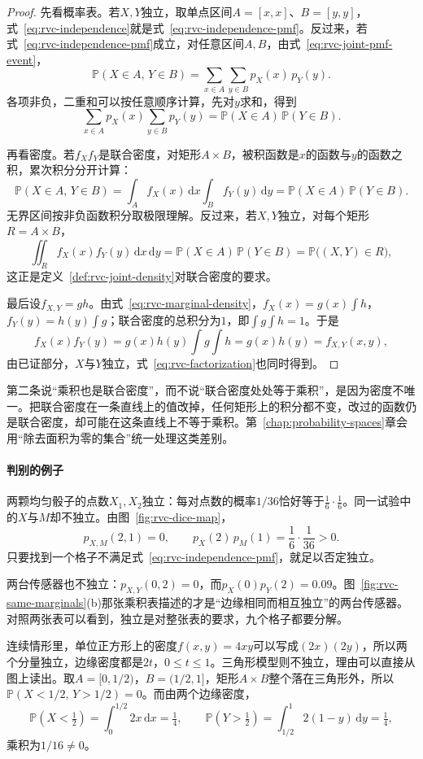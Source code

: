 \begin{proof}
先看概率表。若$X,Y$独立，取单点区间$A=[x,x]$、$B=[y,y]$，式~\eqref{eq:rvc-independence}就是式~\eqref{eq:rvc-independence-pmf}。反过来，若式~\eqref{eq:rvc-independence-pmf}成立，对任意区间$A,B$，由式~\eqref{eq:rvc-joint-pmf-event}，
\[
 \mathbb{P}(X\in A,\,Y\in B)=\sum_{x\in A}\sum_{y\in B}p_X(x)\,p_Y(y).
\]
各项非负，二重和可以按任意顺序计算，先对$y$求和，得到
\[
 \sum_{x\in A}p_X(x)\sum_{y\in B}p_Y(y)=\mathbb{P}(X\in A)\,\mathbb{P}(Y\in B).
\]

再看密度。若$f_Xf_Y$是联合密度，对矩形$A\times B$，被积函数是$x$的函数与$y$的函数之积，累次积分分开计算：
\[
 \mathbb{P}(X\in A,\,Y\in B)=\int_{A}f_X(x)\,\mathrm{d}x\int_{B}f_Y(y)\,\mathrm{d}y=\mathbb{P}(X\in A)\,\mathbb{P}(Y\in B).
\]
无界区间按非负函数积分取极限理解。反过来，若$X,Y$独立，对每个矩形$R=A\times B$，
\[
 \iint_{R}f_X(x)f_Y(y)\,\mathrm{d}x\,\mathrm{d}y=\mathbb{P}(X\in A)\,\mathbb{P}(Y\in B)=\mathbb{P}\bigl((X,Y)\in R\bigr),
\]
这正是定义~\ref{def:rvc-joint-density}对联合密度的要求。

最后设$f_{X,Y}=gh$。由式~\eqref{eq:rvc-marginal-density}，$f_X(x)=g(x)\int h$，$f_Y(y)=h(y)\int g$；联合密度的总积分为$1$，即$\int g\int h=1$。于是
\[
 f_X(x)f_Y(y)=g(x)h(y)\int g\int h=g(x)h(y)=f_{X,Y}(x,y),
\]
由已证部分，$X$与$Y$独立，式~\eqref{eq:rvc-factorization}也同时得到。
\end{proof}

第二条说“乘积也是联合密度”，而不说“联合密度处处等于乘积”，是因为密度不唯一。把联合密度在一条直线上的值改掉，任何矩形上的积分都不变，改过的函数仍是联合密度，却可能在这条直线上不等于乘积。第~\ref{chap:probability-spaces}章会用“除去面积为零的集合”统一处理这类差别。

\paragraph{判别的例子}
两颗均匀骰子的点数$X_1,X_2$独立：每对点数的概率$1/36$恰好等于$\frac16\cdot\frac16$。同一试验中的$X$与$M$却不独立。由图~\ref{fig:rvc-dice-map}，
\[
 p_{X,M}(2,1)=0,\qquad p_X(2)\,p_M(1)=\frac16\cdot\frac1{36}>0 .
\]
只要找到一个格子不满足式~\eqref{eq:rvc-independence-pmf}，就足以否定独立。

两台传感器也不独立：$p_{X,Y}(0,2)=0$，而$p_X(0)p_Y(2)=0.09$。图~\ref{fig:rvc-same-marginals}(b)那张乘积表描述的才是“边缘相同而相互独立”的两台传感器。对照两张表可以看到，独立是对整张表的要求，九个格子都要分解。

连续情形里，单位正方形上的密度$f(x,y)=4xy$可以写成$(2x)(2y)$，所以两个分量独立，边缘密度都是$2t$，$0\leq t\leq 1$。三角形模型则不独立，理由可以直接从图上读出。取$A=[0,1/2)$，$B=(1/2,1]$，矩形$A\times B$整个落在三角形外，所以$\mathbb{P}(X<1/2,\,Y>1/2)=0$。而由两个边缘密度，
\[
 \mathbb{P}(X<\tfrac12)=\int_{0}^{1/2}2x\,\mathrm{d}x=\tfrac14,\qquad
 \mathbb{P}(Y>\tfrac12)=\int_{1/2}^{1}2(1-y)\,\mathrm{d}y=\tfrac14,
\]
乘积为$1/16\neq 0$。

